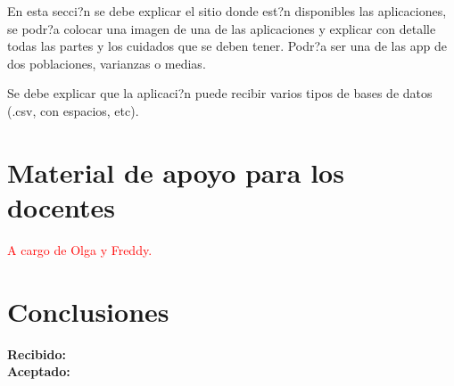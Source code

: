\documentclass[]{comunicaciones}
\begin{document}
En esta secci?n se debe explicar el sitio donde est?n disponibles las aplicaciones, se podr?a colocar una imagen de una de las aplicaciones y explicar con detalle todas las partes y los cuidados que se deben tener. Podr?a ser una de las app de dos poblaciones, varianzas o medias.

Se debe explicar que la aplicaci?n puede recibir varios tipos de bases de datos (.csv, con espacios, etc).



\section{Material de apoyo para los docentes}

\textcolor{red}{A cargo de Olga y Freddy.}

\section{Conclusiones}

\begin{flushright}
\textbf{Recibido: }\\
\textbf{Aceptado: }
\end{flushright}

\nocite{*}
\end{document}
